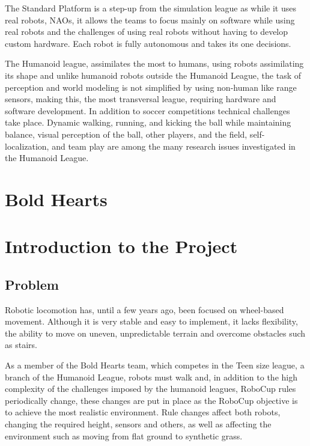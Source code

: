     The Standard Platform is a step-up from the simulation league as while it uses real robots, NAOs, it allows the teams to focus mainly on software while using real robots and the challenges of using real robots without having to develop custom hardware. Each robot is fully autonomous and takes its one decisions.

    The Humanoid league, assimilates the most to humans, using robots assimilating its shape and unlike humanoid robots outside the Humanoid League, the task of perception and world modeling is not simplified by using non-human like range sensors, making this, the most transversal league, requiring hardware and software development. 
    In addition to soccer competitions technical challenges take place. 
    Dynamic walking, running, and kicking the ball while maintaining balance, visual perception of the ball, other players, and the field, self-localization, and team play are among the many research issues investigated in the Humanoid League.

    \section{Bold Hearts}

    \section{Introduction to the Project}

        \subsection{Problem}
        Robotic locomotion has, until a few years ago, been focused on wheel-based movement. Although it is very stable and easy to implement, it lacks flexibility, the ability to move on uneven, unpredictable terrain and overcome obstacles such as stairs.

        As a member of the Bold Hearts team, which competes in the Teen size league, a branch of the Humanoid League, robots must walk and, in addition to the high complexity of the challenges imposed by the humanoid leagues, RoboCup rules periodically change, these changes are put in place as the RoboCup objective is to achieve the most realistic environment. Rule changes affect both robots, changing the required height, sensors and others, as well as affecting the environment such as moving from flat ground to synthetic grass.

